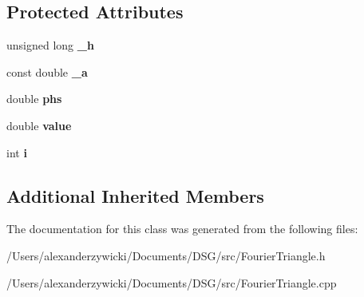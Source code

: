 \subsection*{Protected Attributes}
\begin{DoxyCompactItemize}
\item 
\hypertarget{class_d_s_g_1_1_fourier_1_1_fourier_triangle_a6fe21fae0d58d6221602e4bd74c30a80}{unsigned long {\bfseries \+\_\+h}}\label{class_d_s_g_1_1_fourier_1_1_fourier_triangle_a6fe21fae0d58d6221602e4bd74c30a80}

\item 
\hypertarget{class_d_s_g_1_1_fourier_1_1_fourier_triangle_a64263fc3fa98179d57d34a3f105d8c97}{const double {\bfseries \+\_\+a}}\label{class_d_s_g_1_1_fourier_1_1_fourier_triangle_a64263fc3fa98179d57d34a3f105d8c97}

\item 
\hypertarget{class_d_s_g_1_1_fourier_1_1_fourier_triangle_a274fb09e2f14f88ec969dcaa7ad423f4}{double {\bfseries phs}}\label{class_d_s_g_1_1_fourier_1_1_fourier_triangle_a274fb09e2f14f88ec969dcaa7ad423f4}

\item 
\hypertarget{class_d_s_g_1_1_fourier_1_1_fourier_triangle_a11216186ce96fc78c7720cad3e01d025}{double {\bfseries value}}\label{class_d_s_g_1_1_fourier_1_1_fourier_triangle_a11216186ce96fc78c7720cad3e01d025}

\item 
\hypertarget{class_d_s_g_1_1_fourier_1_1_fourier_triangle_a041154af261bce33f4764f60b6606ea4}{int {\bfseries i}}\label{class_d_s_g_1_1_fourier_1_1_fourier_triangle_a041154af261bce33f4764f60b6606ea4}

\end{DoxyCompactItemize}
\subsection*{Additional Inherited Members}


The documentation for this class was generated from the following files\+:\begin{DoxyCompactItemize}
\item 
/\+Users/alexanderzywicki/\+Documents/\+D\+S\+G/src/Fourier\+Triangle.\+h\item 
/\+Users/alexanderzywicki/\+Documents/\+D\+S\+G/src/Fourier\+Triangle.\+cpp\end{DoxyCompactItemize}
